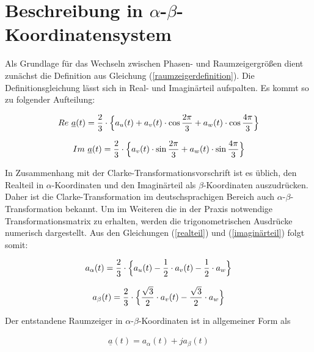 \section{Beschreibung in $\alpha$-$\beta$-Koordinatensystem}\label{sec:clark}

Als Grundlage für das Wechseln zwischen Phasen- und Raumzeigergrößen dient zunächst die Definition aus Gleichung (\ref{raumzeigerdefinition}). Die Definitionsgleichung lässt sich in Real- und Imaginärteil aufspalten. Es kommt so zu folgender Aufteilung:

\begin{align}
	Re~{\underline{a}(t)} = \frac{2}{3} \cdot \Bigl\{ a_{u}(t) + a_{v}(t) \cdot\cos{\frac{2 \pi}{3}} + a_{w}(t) \cdot\cos{\frac{4 \pi}{3}} \Bigr\}
	\label{realteil}
\end{align}

\begin{align}
	Im~{\underline{a}(t)} = \frac{2}{3} \cdot \Bigl\{a_{v}(t)\cdot\sin{\frac{2 \pi}{3}} + a_{w}(t) \cdot\sin{\frac{4 \pi}{3}} \Bigr\}
	\label{imaginärteil}
\end{align}

In Zusammenhang mit der Clarke-Transformationsvorschrift ist es üblich, den Realteil in $\alpha$-Koordinaten und den Imaginärteil als $\beta$-Koordinaten auszudrücken. 
Daher ist die Clarke-Transformation im deutschsprachigen Bereich auch $\alpha$-$\beta$-Transformation bekannt.
Um im Weiteren die in der Praxis notwendige Transformationsmatrix zu erhalten, werden die trigonometrischen Ausdrücke numerisch dargestellt. 
Aus den Gleichungen (\ref{realteil}) und (\ref{imaginärteil}) folgt somit:

\begin{align}
	a_{\alpha}(t) = \frac{2}{3} \cdot \Bigl\{ a_{u}(t) - \frac{1}{2} \cdot a_{v}(t) - \frac{1}{2} \cdot a_{w}  \Bigr\}
	\label{alpha}
\end{align}

\begin{align}
	a_{\beta}(t) = \frac{2}{3} \cdot \Bigl\{\frac{\sqrt{3}}{2} \cdot a_{v}(t) - \frac{\sqrt{3}}{2} \cdot a_{w}  \Bigr\}
	\label{beta}
\end{align}

Der entstandene Raumzeiger in  $\alpha$-$\beta$-Koordinaten ist in allgemeiner Form als 

\begin{align}
	\underline{a}(t) = a_{\alpha}(t) +j a_{\beta}(t)
	\label{raumzeigeralphabeta}
\end{align}

